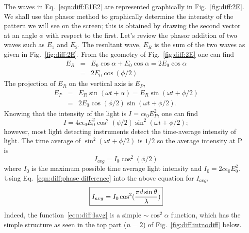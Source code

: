 The waves in Eq.~\ref{eqn:diff:E1E2} are represented graphically 
in Fig.~\ref{fig:diff:2E}.
We shall use the phasor method to graphically determine the intensity
of the pattern we will see on the screen; this is obtained by drawing the 
second vector at an angle $\phi$ with respect to the first.  
Let's review the phasor addition
of two waves such as $E_1$ and $E_2$.  The resultant wave, $E_R$ is the
sum of the two waves as
given in Fig.~\ref{fig:diff:2E}.  From the geometry of Fig.~\ref{fig:diff:2E}
one can find
\begin{eqnarray}
E_R & = & E_0 \cos \alpha + E_0  \cos \alpha  = 2 E_0 \cos \alpha \\
   & = & 2E_0 \cos (\phi/2)
\end{eqnarray} 
The projection of $E_R$ on the vertical 
axis is $E_P$,
\begin{eqnarray}
E_P & = & E_R \sin (\omega t + \alpha) = E_R \sin (\omega t + \phi/2) \\
    & = & 2 E_0 \cos( \phi/2) \sin (\omega t + \phi/2).
\end{eqnarray}
Knowing that the intensity of the light is $I=c \epsilon_0 E_P^2$, one can find
\begin{equation}
I = 4 c \epsilon_0 E_0^2 \cos^2(\phi/2)\sin^2(\omega t + \phi/2);
\end{equation}
however, most light detecting instruments detect the time-average intensity 
of light.
The time average of $\sin ^2 (\omega t + \phi/2)$ is $1/2$ so the average 
intensity at P is
$$
I_{avg} = I_0 \cos ^2 (\phi/2) 
$$
where $I_0$ is the maximum possible time average light intensity and
$I_0 = 2 c \epsilon_0 E_0^2$.
Using Eq.~\ref{eqn:diff:phase difference} 
into the above equation for $I_{avg}$,
\begin{equation}
\fbox{$ \displaystyle I_{avg} = I_0 \cos^2 (\frac{\pi d \sin \theta}{\lambda})$}
\label{eqn:diff:Iavg}
\end{equation}
Indeed, the function~\ref{eqn:diff:Iavg} is a simple $\sim \cos^2 \alpha$
function, which has the simple structure as seen in the top part ($n=2$) of 
Fig.~\ref{fig:diff:intnodiff} below. 

